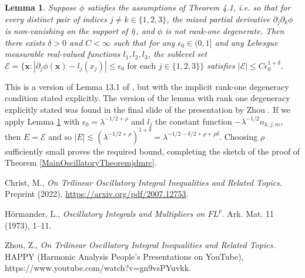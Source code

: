 \documentclass[12pt]{amsart}
\newtheorem{lemma}[thm]{Lemma}
\begin{document}
\begin{lemma} \label{LevelSetLemmajdmrc}
    Suppose $\phi$ satisfies the assumptions of Theorem 4.1, i.e. so that for every distinct pair of indices $j\neq k\in\{1,2,3\}$, the mixed partial derivative $\partial_j \partial_k \phi$ is non-vanishing on the support of $\Tilde{\eta}$, and $\phi$ is not rank-one degenerate. Then there exists $\delta>0$ and $C<\infty$ such that for any $\epsilon_0\in (0,1]$ and any Lebesgue measurable real-valued functions $l_1,l_2,l_3$, the sublevel set 
    $
    \mathcal{E}=\big\{\boldsymbol{x}:|\partial_j \phi(\boldsymbol{x})-l_j(x_j)|\leq \epsilon_0 \text{  for each } j\in \{1,2,3\}\big\}
    $
    satisfies $|\mathcal{E}|\leq C \epsilon_0^{1+\delta}$.
\end{lemma}

This is a version of Lemma 13.1 of \cite{ChristTopicPaperjdmrc}, but with the implicit rank-one degeneracy condition stated explicitly. The version of the lemma with rank one degeneracy explicitly stated was found in the final slide of the presentation by Zhou \cite{Zhoujdmrc}. If we apply Lemma \ref{LevelSetLemmajdmrc} with $\epsilon_0=\lambda^{-1/2+\rho}$ and $l_j$ the constant function $-\lambda^{-1/2} n_{k,j,m}$, then $E=\mathcal{E}$ and so $|E|\lesssim (\lambda^{-1/2+\rho})^{1+\delta}=\lambda^{-1/2-\delta/2+\rho+\rho\delta}$. Choosing $\rho$ sufficiently small proves the required bound, completing the sketch of the proof of Theorem \ref{MainOscillatoryTheoremjdmrc}.





\begin{thebibliography}{03}

Christ, M., \emph{On Trilinear Oscillatory Integral Inequalities and Related Topics}.
Preprint (2022), \href{https://arxiv.org/pdf/2007.12753}{https://arxiv.org/pdf/2007.12753}.

H\"{o}rmander, L., \emph{Oscillatory Integrals and Multipliers on $FL^p$}. Ark. Mat. 11 (1973), 1--11.

Zhou, Z., \emph{On Trilinear Oscillatory Integral Inequalities and Related Topics.} HAPPY (Harmonic Analysis People's Presentations on YouTube), https://www.youtube.com/watch?v=gn9vsPYuvkk.

\end{thebibliography}
\end{document}

